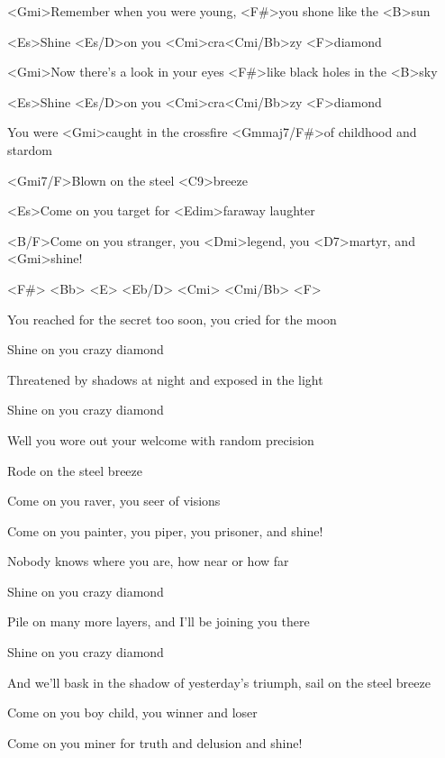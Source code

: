 

\zs
<Gmi>Remember when you were young,
<F#>you shone like the <B>sun

<Es>Shine <Es/D>on you <Cmi>cra<Cmi/Bb>zy <F>diamond

<Gmi>Now there's a look in your eyes
<F#>like black holes in the <B>sky

<Es>Shine <Es/D>on you <Cmi>cra<Cmi/Bb>zy <F>diamond

You were <Gmi>caught in the crossfire
<Gmmaj7/F#>of childhood and stardom

<Gmi7/F>Blown on the steel <C9>breeze

<Es>Come on you target for <Edim>faraway laughter

<B/F>Come on you stranger, you <Dmi>legend, you <D7>martyr, and <Gmi>shine!
\ks

<F#> <Bb> <E> <Eb/D> <Cmi> <Cmi/Bb> <F>

\zs
You reached for the secret too soon,
you cried for the moon

Shine on you crazy diamond

Threatened by shadows at night
and exposed in the light

Shine on you crazy diamond

Well you wore out your welcome
with random precision

Rode on the steel breeze

Come on you raver, you seer of visions

Come on you painter, you piper, you prisoner, and shine!
\ks

\zs
Nobody knows where you are,
how near or how far

Shine on you crazy diamond

Pile on many more layers,
and I'll be joining you there

Shine on you crazy diamond

And we'll bask in the shadow of yesterday's triumph,
sail on the steel breeze

Come on you boy child, you winner and loser

Come on you miner for truth and delusion and shine!
\ks

\kp





